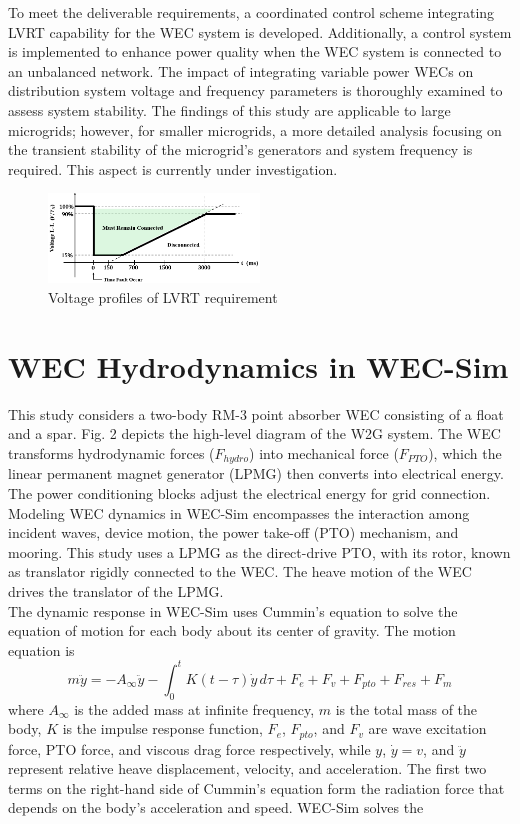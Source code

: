 \documentclass[conference]{IEEEtran}
\begin{document}
To meet the deliverable requirements, a coordinated control scheme integrating LVRT capability for the WEC system is developed. Additionally, a control system is implemented to enhance power quality when the WEC system is connected to an unbalanced network. The impact of integrating variable power WECs on distribution system voltage and frequency parameters is thoroughly examined to assess system stability. The findings of this study are applicable to large microgrids; however, for smaller microgrids, a more detailed analysis focusing on the transient stability of the microgrid's generators and system frequency is required. This aspect is currently under investigation.\\
\begin{figure}[ht]
\centerline{\includegraphics[width=0.5\textwidth]{Figs/5_3_1/lvrt_limit.png}}
\vspace{-0.8em}
\caption{Voltage profiles of LVRT requirement}
\label{fig1}
\end{figure}

\section{WEC Hydrodynamics in WEC-Sim}
This study considers a two-body RM-3 point absorber WEC consisting of a float and a spar. Fig. 2 depicts the high-level diagram of the W2G system. The WEC transforms hydrodynamic forces ($F_{hydro}$) into mechanical force ($F_{PTO}$), which the linear permanent magnet generator (LPMG) then converts into electrical energy. The power conditioning blocks adjust the electrical energy for grid connection.\\
Modeling WEC dynamics in WEC-Sim encompasses the interaction among incident waves, device motion, the power take-off (PTO) mechanism, and mooring. This study uses a LPMG as the direct-drive PTO, with its rotor, known as translator rigidly connected to the WEC. The heave motion of the WEC drives the translator of the LPMG.\\
The dynamic response in WEC-Sim uses Cummin's equation to solve the equation of motion for each body about its center of gravity. The motion equation is 
\begin{equation}
m\ddot{y} = -A_{\infty} \ddot{y} - \int_{0}^{t} K(t-\tau) \dot{y} \, d\tau + F_e + F_v + F_{pto} + F_{res} + F_m
\end{equation}
where $A_{\infty}$ is the added mass at infinite frequency, $m$ is the total mass of the body, $K$ is the impulse response function, $F_e$, $F_{pto}$, and $F_v$ are wave excitation force, PTO force, and viscous drag force respectively, while $y$, $\dot{y}=v$, and $\ddot{y}$ represent relative heave displacement, velocity, and acceleration. 
The first two terms on the right-hand side of Cummin's equation form the radiation force that depends on the body's acceleration and speed. WEC-Sim solves the 
\end{document}
